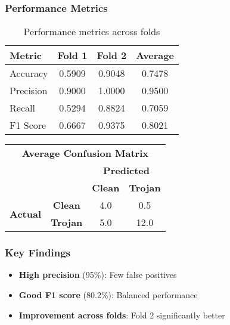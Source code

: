 \documentclass[aspectratio=169]{beamer}
\begin{document}
\begin{frame}
\frametitle{Performance Metrics}
\begin{table}
\centering
\begin{tabular}{lcc|c}
\toprule
\textbf{Metric} & \textbf{Fold 1} & \textbf{Fold 2} & \textbf{Average} \\
\midrule
Accuracy & 0.5909 & 0.9048 & 0.7478 \\
Precision & 0.9000 & 1.0000 & 0.9500 \\
Recall & 0.5294 & 0.8824 & 0.7059 \\
F1 Score & 0.6667 & 0.9375 & 0.8021 \\
\bottomrule
\end{tabular}
\caption{Performance metrics across folds}
\end{table}

\begin{table}
\centering
\begin{tabular}{cc|cc}
\multicolumn{4}{c}{\textbf{Average Confusion Matrix}} \\
\multicolumn{2}{c}{} & \multicolumn{2}{c}{\textbf{Predicted}} \\
& & \textbf{Clean} & \textbf{Trojan} \\
\cmidrule{3-4}
\multirow{2}{*}{\textbf{Actual}} & \textbf{Clean} & 4.0 & 0.5 \\
& \textbf{Trojan} & 5.0 & 12.0 \\
\end{tabular}
\end{table}
\end{frame}

\begin{frame}
\frametitle{Key Findings}
\begin{itemize}
    \item \textbf{High precision} (95\%): Few false positives
    \item \textbf{Good F1 score} (80.2\%): Balanced performance
    \item \textbf{Improvement across folds}: Fold 2 significantly better
\end{itemize}
\end{frame}
\end{document}
